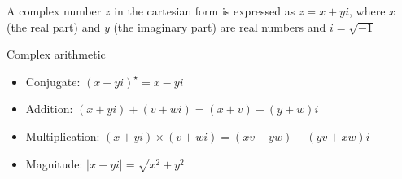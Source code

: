 \documentclass[8pt,a4paper,compress]{beamer}
\begin{document}
\begin{frame}[fragile]
\pause

\begin{minipage}{200pt}
A complex number $z$ in the cartesian form is expressed as $z = x+yi$, where $x$ (the real part) and $y$ (the imaginary part) are real numbers and $i=\sqrt{-1}$
\end{minipage}%
\hfill
\begin{minipage}{100pt}
\begin{center}
\end{center}
\end{minipage}%

\pause
\bigskip

Complex arithmetic
\begin{itemize}
\item Conjugate: $(x+yi)^\star=x-yi$

\item Addition: $(x+yi)+(v+wi) = (x+v) + (y+w)i$

\item Multiplication: $(x+yi)\times(v+wi) = (xv-yw) + (yv+xw)i$

\item Magnitude: $|x+yi|=\sqrt{x^2+y^2}$
\end{itemize}

\pause
\bigskip


\end{frame}
\end{document}
